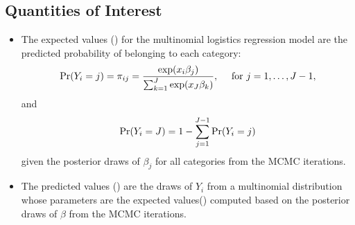 \documentclass[letterpaper,10pt,english]{sphinxmanual}
\begin{document}
\subsection{Quantities of Interest}
\label{vignette:id78}\begin{itemize}
\item {} 
The expected values () for the multinomial logistics
regression model are the predicted probability of belonging to each
category:
\begin{gather}
\begin{split}\begin{aligned}
\Pr(Y_i=j)=\pi_{ij}=\frac{\exp(x_i \beta_j)}{\sum_{k=1}^J \exp(x_J
\beta_k)}, \quad \textrm{ for } j=1,\ldots, J-1,\end{aligned}\end{split}\notag
\end{gather}
and
\begin{gather}
\begin{split}\begin{aligned}
\Pr(Y_i=J)=1-\sum_{j=1}^{J-1}\Pr(Y_i=j)\end{aligned}\end{split}\notag
\end{gather}
given the posterior draws of \(\beta_j\) for all categories from
the MCMC iterations.

\item {} 
The predicted values () are the draws of \(Y_i\) from a
multinomial distribution whose parameters are the expected
values() computed based on the posterior draws of
\(\beta\) from the MCMC iterations.


\end{itemize}
\end{document}
